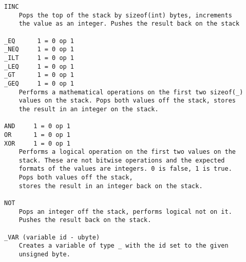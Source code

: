\begin{verbatim}
IINC
    Pops the top of the stack by sizeof(int) bytes, increments
    the value as an integer. Pushes the result back on the stack

_EQ	     1 = 0 op 1
_NEQ     1 = 0 op 1
_ILT     1 = 0 op 1
_LEQ     1 = 0 op 1
_GT	     1 = 0 op 1
_GEQ     1 = 0 op 1
    Performs a mathematical operations on the first two sizeof(_)
    values on the stack. Pops both values off the stack, stores
    the result in an integer on the stack.

AND     1 = 0 op 1
OR      1 = 0 op 1
XOR	    1 = 0 op 1
    Performs a logical operation on the first two values on the
    stack. These are not bitwise operations and the expected
    formats of the values are integers. 0 is false, 1 is true.
    Pops both values off the stack,
    stores the result in an integer back on the stack.

NOT
    Pops an integer off the stack, performs logical not on it.
    Pushes the result back on the stack.
	
_VAR (variable id - ubyte)
    Creates a variable of type _ with the id set to the given
    unsigned byte.
\end{verbatim}
